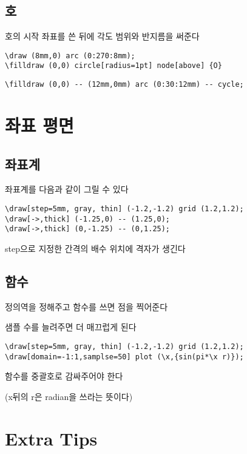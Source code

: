 \documentclass[12pt]{beamer}
\begin{document}
\subsection{호}
\begin{frame}[fragile]{\secname}{\subsecname}
	호의 시작 좌표를 쓴 뒤에 각도 범위와 반지름을 써준다	
	\begin{lstlisting}
\draw (8mm,0) arc (0:270:8mm);
\filldraw (0,0) circle[radius=1pt] node[above] {O}
	\end{lstlisting}
	
	\begin{lstlisting}
\filldraw (0,0) -- (12mm,0mm) arc (0:30:12mm) -- cycle;
	\end{lstlisting}
	
\end{frame}

	
\section{좌표 평면}
\subsection{좌표계}
\begin{frame}[fragile]{\secname}{\subsecname}
	 좌표계를 다음과 같이 그릴 수 있다
	\begin{lstlisting}
\draw[step=5mm, gray, thin] (-1.2,-1.2) grid (1.2,1.2);
\draw[->,thick] (-1.25,0) -- (1.25,0);
\draw[->,thick] (0,-1.25) -- (0,1.25);
	\end{lstlisting}
	
	\vfill
	step으로 지정한 간격의 배수 위치에 격자가 생긴다
\end{frame}

\subsection{함수}
\begin{frame}[fragile]{\secname}{\subsecname}
	정의역을 정해주고 함수를 쓰면 점을 찍어준다
	
	샘플 수를 늘려주면 더 매끄럽게 된다
	\begin{lstlisting}
\draw[step=5mm, gray, thin] (-1.2,-1.2) grid (1.2,1.2);
\draw[domain=-1:1,samplse=50] plot (\x,{sin(pi*\x r)});
	\end{lstlisting}
	
	\vfill
	함수를 중괄호로 감싸주어야 한다
	
	(x뒤의 r은 radian을 쓰라는 뜻이다)
\end{frame}

\section{Extra Tips}
\end{document}
